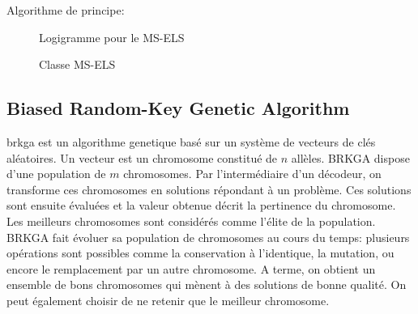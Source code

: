 			Algorithme de principe:
			\begin{code}
				\begin{algo}[informal]
					\BEGIN
									\ENDIF
								\ENDFOR
								\ENDIF
							\ENDFOR
						\ENDFOR
					\END
				\end{algo}
			\end{code}
			\newpage

			\begin{figure}[H]
				\centering
				\begin{tikzpicture}[node distance=1cm]
					
				\end{tikzpicture}
				\caption{Logigramme pour le MS-ELS}
				\label{fig:ms-els-logigram}
			\end{figure}

			\begin{figure}[H]			
				\centering
				\begin{tikzpicture}
					
				\end{tikzpicture}
				\caption[UML -- Métaheuristique MS-ELS]{Classe MS-ELS}
				\label{uml:ms-els}
			\end{figure}

		\subsection{Biased Random-Key Genetic Algorithm}
			\Gls{brkga} est un \gls{algorithme genetique} basé sur un système de vecteurs de clés aléatoires. Un vecteur est un chromosome constitué de $n$ allèles. BRKGA dispose d'une population de $m$ chromosomes. Par l'intermédiaire d'un décodeur, on transforme ces chromosomes en solutions répondant à un problème. Ces solutions sont ensuite évaluées et la valeur obtenue décrit la pertinence du chromosome. Les meilleurs chromosomes sont considérés comme l'élite de la population. BRKGA fait évoluer sa population de chromosomes au cours du temps: plusieurs opérations sont possibles comme la conservation à l'identique, la mutation, ou encore le remplacement par un autre chromosome. A terme, on obtient un ensemble de bons chromosomes qui mènent à des solutions de bonne qualité. On peut également choisir de ne retenir que le meilleur chromosome.

